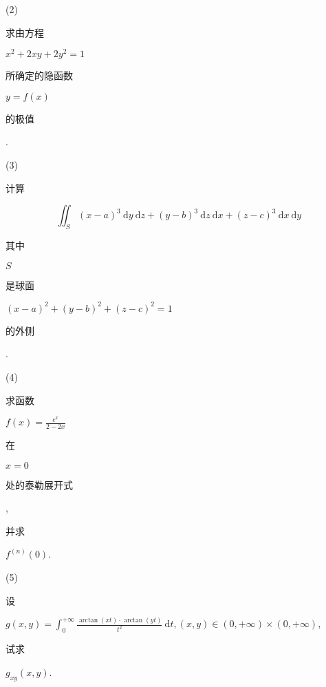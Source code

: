 \documentclass[10pt]{article}
\begin{document}
(2) \begin{CJK}{UTF8}{mj}求由方程\end{CJK} $x^{2}+2 x y+2 y^{2}=1$ \begin{CJK}{UTF8}{mj}所确定的隐函数\end{CJK} $y=f(x)$ \begin{CJK}{UTF8}{mj}的极值\end{CJK}.

(3) \begin{CJK}{UTF8}{mj}计算\end{CJK}
$$
\iint_{S}(x-a)^{3} \mathrm{~d} y \mathrm{~d} z+(y-b)^{3} \mathrm{~d} z \mathrm{~d} x+(z-c)^{3} \mathrm{~d} x \mathrm{~d} y
$$
\begin{CJK}{UTF8}{mj}其中\end{CJK} $S$ \begin{CJK}{UTF8}{mj}是球面\end{CJK} $(x-a)^{2}+(y-b)^{2}+(z-c)^{2}=1$ \begin{CJK}{UTF8}{mj}的外侧\end{CJK}.

(4)\begin{CJK}{UTF8}{mj}求函数\end{CJK} $f(x)=\frac{e^{x}}{2-2 x}$ \begin{CJK}{UTF8}{mj}在\end{CJK} $x=0$ \begin{CJK}{UTF8}{mj}处的泰勒展开式\end{CJK}, \begin{CJK}{UTF8}{mj}并求\end{CJK} $f^{(n)}(0)$.

(5) \begin{CJK}{UTF8}{mj}设\end{CJK} $g(x, y)=\int_{0}^{+\infty} \frac{\arctan (x t) \cdot \arctan (y t)}{t^{2}} \mathrm{~d} t,(x, y) \in(0,+\infty) \times(0,+\infty)$, \begin{CJK}{UTF8}{mj}试求\end{CJK} $g_{x y}(x, y)$.
\end{document}
